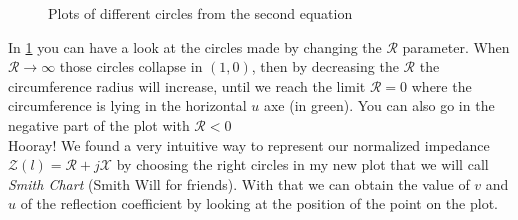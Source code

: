 \begin{figure}[H]
    \begin{center}
    \end{center}\caption{Plots of different circles from the second equation}\label{fig:y_cicles} 
\end{figure}
In \cref{fig:y_cicles} you can have a look at the circles made by changing the $\mathcal{R}$ parameter. When $\mathcal{R}\rightarrow \infty$ those circles collapse in $(1,0)$, then by decreasing the $\mathcal{R}$ the circumference radius will increase, until we reach the limit $\mathcal{R}=0$ where the circumference is lying in the horizontal $u$ axe (in green). You can also go in the negative part of the plot with $\mathcal{R}<0$\\
Hooray! We found a very intuitive way to represent our normalized impedance $\mathcal{Z} (l) = \mathcal{R}+j\mathcal{X}$ by choosing the right circles in my new plot that we will call \emph{Smith Chart} (Smith Will for friends). With that we can obtain the value of $v$ and $u$ of the reflection coefficient by looking at the position of the point on the plot.
